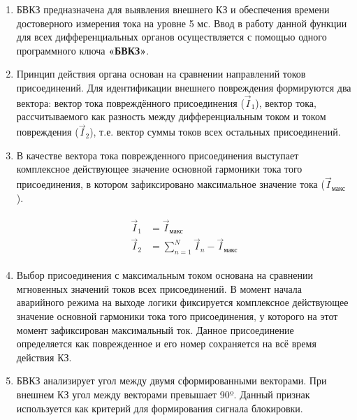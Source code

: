 \begin{enumerate}[label=\arabic{section}.\arabic{subsection}.\arabic{enumi}, labelsep=4pt, leftmargin=0pt, itemindent=57pt, itemsep=0pt, parsep=5pt]
\begin{enumerate}[label=\arabic{section}.\arabic{subsection}.\arabic{enumi}.\arabic*, labelsep=4pt, leftmargin=0em, itemindent=65pt, parsep=0pt]

\item
БВКЗ предназначена для выявления внешнего КЗ и обеспечения времени достоверного измерения тока на уровне 5 мс.
Ввод в работу данной функции для всех дифференциальных органов осуществляется с помощью одного программного ключа \textbf{«БВКЗ»}.

\item
Принцип действия органа основан на сравнении направлений токов присоединений.
Для идентификации внешнего повреждения формируются два вектора: вектор тока повреждённого присоединения ($ \vec{I}_1 $), вектор тока, рассчитываемого как разность между дифференциальным током и током повреждения ($ \vec{I}_2 $), т.е. вектор суммы токов всех остальных присоединений.

\item
В качестве вектора тока поврежденного присоединения выступает комплексное действующее значение основной гармоники тока того присоединения, в котором зафиксировано максимальное значение тока ($ \vec{I}_\textit{макс} $).

\begin{align}
\begin{split}
\vec{I}_1&=\vec{I}_\textit{макс}\\
\vec{I}_2&=\sum_{n=1}^N \vec{I}_{n} - \vec{I}_\textit{макс}
\end{split}
\end{align}

\item
Выбор присоединения с максимальным током основана на сравнении мгновенных значений токов всех присоединений.
В момент начала аварийного режима на выходе логики фиксируется комплексное действующее значение основной гармоники тока того присоединения, у которого на этот момент зафиксирован максимальный ток.
Данное присоединение определяется как поврежденное и его номер сохраняется на всё время действия КЗ.

\item
БВКЗ анализирует угол между двумя сформированными векторами.
При внешнем КЗ угол между векторами превышает 90º.
Данный признак используется как критерий для формирования сигнала блокировки.

\medskip


\end{enumerate}
\end{enumerate}
